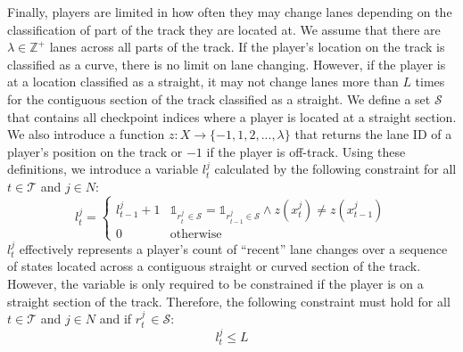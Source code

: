 Finally, players are limited in how often they may change lanes depending on the classification of part of the track they are located at. We assume that there are $\lambda \in \mathbb{Z^+}$ lanes across all parts of the track. If the player's location on the track is classified as a curve, there is no limit on lane changing. However, if the player is at a location classified as a straight, it may not change lanes more than $L$ times for the contiguous section of the track classified as a straight. We define a set $\mathcal{S}$ that contains all checkpoint indices where a player is located at a straight section. We also introduce a function $z: X \rightarrow \{-1, 1, 2, ..., \lambda\}$ that returns the lane ID of a player's position on the track or $-1$ if the player is off-track. Using these definitions, we introduce a variable $l^j_t$ calculated by the following constraint for all $t \in \mathcal{T}$ and $j \in N$:
\begin{equation} \label{eq:gen_lane_var}
    l^j_{t} =  \begin{cases} l^j_{t-1} + 1 & \mathds{1}_{r^j_t \, \in \mathcal{S}} = \mathds{1}_{r^j_{t-1} \in \mathcal{S}}\wedge z(x^j_t) \neq z(x^j_{t-1}) \\
    0 & \text{otherwise}  \end{cases}
\end{equation}
$l^j_{t}$ effectively represents a player's count of ``recent'' lane changes over a sequence of states located across a contiguous straight or curved section of the track. However, the variable is only required to be constrained if the player is on a straight section of the track. Therefore, the following constraint must hold for all $t \in \mathcal{T}$ and $j \in N$ and if $r^j_t \, \in \mathcal{S}$:
\begin{equation} \label{eq:gen_lane_lim}
    l^j_{t} \leq  L
\end{equation}
